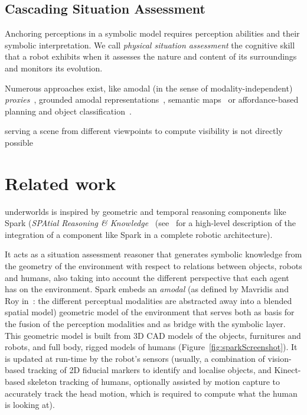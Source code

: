 \documentclass[letterpaper, 10 pt, conference]{ieeeconf}  %
\newcommand{\uwds}{{\sc underworlds}\xspace}
\begin{document}
\subsection{Cascading Situation Assessment}

Anchoring perceptions in a symbolic model requires perception abilities and
their symbolic interpretation. We call \emph{physical situation assessment} the
cognitive skill that a robot exhibits when it assesses the nature and content of its
surroundings and monitors its evolution.

Numerous approaches exist, like amodal (in the sense of modality-independent)
\emph{proxies}~\cite{Jacobsson2008}, grounded amodal
representations~\cite{Mavridis2006}, semantic
maps~\cite{Nuechter2008, Galindo2008,Blodow2011} or affordance-based planning
and object classification~\cite{Lorken2008, Varadarajan2011}.

serving a scene from
different viewpoints to compute visibility is not directly possible


\section{Related work}


\cite{sisbot2011situation}
\cite{naef2003blue}
\cite{bustos2016unified}

\uwds is inspired by geometric and temporal reasoning components like {\sc
Spark} (\emph{SPAtial Reasoning \&
Knowledge}~\cite{sisbot2011situation} (see~\cite{lemaignan2016artificial} for a
high-level description of the integration of a component like {\sc Spark} in a
complete robotic architecture).

It acts as a situation assessment reasoner that generates symbolic knowledge from the
geometry of the environment with respect to relations between objects, robots
and humans, also
taking into account the different perspective that each agent has on the
environment.  {\sc Spark} embeds an \emph{amodal} (as defined by Mavridis and
Roy in~\cite{Mavridis2006}: the different perceptual modalities are abstracted
away into a blended spatial model) geometric model of the environment that
serves both as basis for the fusion of the perception modalities and as bridge
with the symbolic layer. This geometric model is built from 3D CAD models of the
objects, furnitures and robots, and full body, rigged models of humans
(Figure~\ref{fig:sparkScreenshot}).  It is updated at run-time by the robot's
sensors (usually, a combination of vision-based tracking of 2D fiducial markers
to identify and localise objects, and Kinect-based skeleton tracking of humans,
optionally assisted by motion capture to accurately track the head motion, which
is required to compute what the human is looking at).
\end{document}
